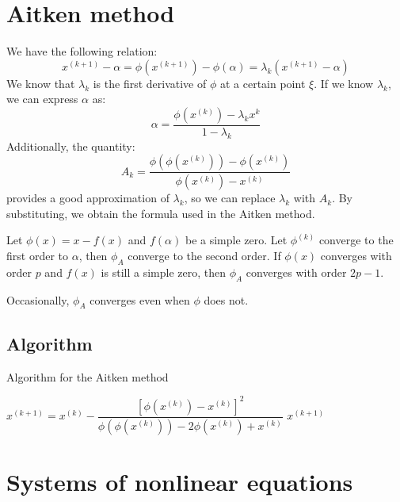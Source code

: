 \documentclass[12pt, a4paper]{report}
\begin{document}
    \section{Aitken method}
    We have the following relation:
    \[x^{(k+1)}-\alpha=\phi(x^{(k+1)})-\phi(\alpha)=\lambda_k\left( x^{(k+1)}-\alpha \right)\]
    We know that $\lambda_k$ is the first derivative of $\phi$ at a certain point $\xi$. 
    If we know $\lambda_k$, we can express $\alpha$ as: 
    \[\alpha=\dfrac{\phi(x^{(k)})-\lambda_k x^{k}}{1-\lambda_k}\]
    Additionally, the quantity:
    \[A_k=\dfrac{\phi(\phi(x^{(k)}))-\phi(x^{(k)})}{\phi(x^{(k)})-x^{(k)}}\]
    provides a good approximation of $\lambda_k$, so we can replace $\lambda_k$ with $A_k$. 
    By substituting, we obtain the formula used in the Aitken method.
    \begin{theorem}
        Let $\phi(x)=x-f(x)$ and $f(\alpha)$ be a simple zero. 
        Let $\phi^{(k)}$ converge to the first order to $\alpha$, then $\phi_A$ converge to the second order. 
        If $\phi(x)$ converges with order $p$ and $f(x)$ is still a simple zero, then $\phi_A$ converges with order $2p-1$. 
    \end{theorem}
    Occasionally, $\phi_A$ converges even when $\phi$ does not.

    \subsection{Algorithm}
    \begin{algorithm}[H]
        \caption{Algorithm for the Aitken method}
            \begin{algorithmic}[1]
                    \State $x^{(k+1)}=x^{(k)}-\dfrac{\left[ \phi(x^{(k)})-x^{(k)} \right]^2}{\phi(\phi(x^{(k)}))-2\phi(x^{(k)})+x^{(k)}}$
                        \State \Return $x^{(k+1)}$
                    \EndIf
                \EndFor
            \end{algorithmic}
    \end{algorithm}

    \section{Systems of nonlinear equations}
\end{document}
